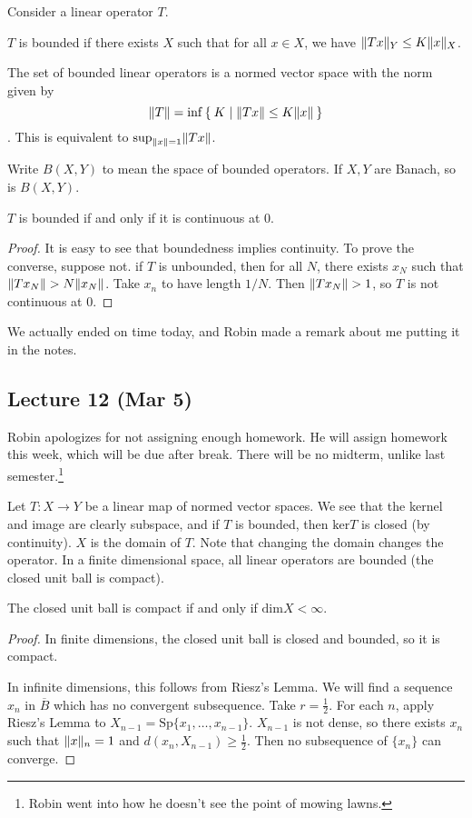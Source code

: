 \documentclass[10pt, twoside]{article}
\begin{document}
    Consider a linear operator $T$.  \begin{defn} $T$
    is bounded if there exists $X$ such that for all $x \in X$, we have
$\lVert Tx\rVert_Y \leq K \lVert x\rVert_X$.  \end{defn}

    The set of bounded linear operators is a normed vector space with the norm
    given by \[\lVert T\rVert= \inf\Set{K | \lVert Tx\rVert \leq K \lVert x\rVert}\]. This is
    equivalent to $\sup_{\lVert x\rVert = 1} \lVert Tx\rVert$.

    Write $B(X,Y)$ to mean the space of bounded operators. If $X,Y$ are Banach,
    so is $B(X,Y)$.

    \begin{thm} $T$ is bounded if and only if it is continuous at $0$.
        \begin{proof} It is easy to see that boundedness implies continuity. To
            prove the converse, suppose not. if $T$ is unbounded, then for all
            $N$, there exists $x_N$ such that $\lVert Tx_N\rVert > N \lVert x_N\rVert$.
            Take $x_n$ to have length $1/N$. Then $\lVert Tx_N\rVert > 1$, so $T$ is
            not continuous at $0$.  \end{proof} \end{thm} We actually ended on
            time today, and Robin made a remark about me putting it in the
            notes.

    \subsection{Lecture 12 (Mar 5)} Robin apologizes for not assigning enough
    homework. He will assign homework this week, which will be due after break.
    There will be no midterm, unlike last semester.\footnote{Robin went into
    how he doesn't see the point of mowing lawns.}
    
    Let $T:X \to Y$ be a linear map of normed vector spaces. We see that the
    kernel and image are clearly subspace, and if $T$ is bounded, then
    $\mathrm{ker} T$ is closed (by continuity). $X$ is the domain of $T$. Note
    that changing the domain changes the operator. In a finite dimensional
    space, all linear operators are bounded (the closed unit ball is compact).

    \begin{lem} The closed unit ball is compact if and only if $\mathrm{dim} X
        < \infty$.  \begin{proof} In finite dimensions, the closed unit ball is
            closed and bounded, so it is compact.

            In infinite dimensions, this follows from Riesz's Lemma. We will
        find a sequence $x_n$ in $\overline{B}$ which has no convergent
    subsequence. Take $r = \frac{1}{2}$. For each $n$, apply Riesz's Lemma to
$X_{n-1} = \mathrm{Sp}\{x_1, \ldots, x_{n-1}\}$. $X_{n-1}$ is not dense, so
there exists $x_n$ such that $\lVert x\rVert_n = 1$ and $d(x_n, X_{n-1}) \geq
\frac{1}{2}$. Then no subsequence of $\{x_n\}$ can converge.  \end{proof}
\end{lem}
\end{document}
